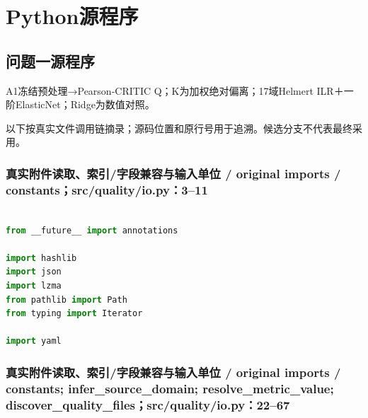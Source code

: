 


\appendix

\section{Python源程序}

\lstset{basicstyle=\ttfamily\scriptsize,breaklines=true,columns=fullflexible,keepspaces=true,numbers=left,numberstyle=\tiny,showstringspaces=false,frame=single,tabsize=4}

\subsection{问题一源程序}

A1冻结预处理→Pearson-CRITIC Q；K为加权绝对偏离；17域Helmert ILR＋一阶ElasticNet；Ridge为数值对照。

以下按真实文件调用链摘录；源码位置和原行号用于追溯。候选分支不代表最终采用。

\subsubsection{真实附件读取、索引/字段兼容与输入单位 / original imports / constants；src/quality/io.py：3–11}

\begin{lstlisting}[language=Python,firstnumber=3]

from __future__ import annotations

import hashlib
import json
import lzma
from pathlib import Path
from typing import Iterator

import yaml

\end{lstlisting}

\subsubsection{真实附件读取、索引/字段兼容与输入单位 / original imports / constants; infer\_source\_domain; resolve\_metric\_value; discover\_quality\_files；src/quality/io.py：22–67}

